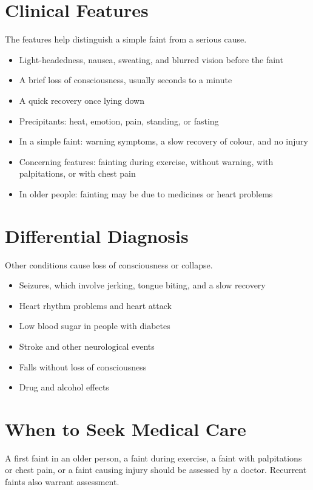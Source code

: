 \section*{Clinical Features}
The features help distinguish a simple faint from a serious cause.
\begin{itemize}
    \item Light-headedness, nausea, sweating, and blurred vision before the faint
    \item A brief loss of consciousness, usually seconds to a minute
    \item A quick recovery once lying down
    \item Precipitants: heat, emotion, pain, standing, or fasting
    \item In a simple faint: warning symptoms, a slow recovery of colour, and no injury
    \item Concerning features: fainting during exercise, without warning, with palpitations, or with chest pain
    \item In older people: fainting may be due to medicines or heart problems
\end{itemize}

\section*{Differential Diagnosis}
Other conditions cause loss of consciousness or collapse.
\begin{itemize}
    \item Seizures, which involve jerking, tongue biting, and a slow recovery
    \item Heart rhythm problems and heart attack
    \item Low blood sugar in people with diabetes
    \item Stroke and other neurological events
    \item Falls without loss of consciousness
    \item Drug and alcohol effects
\end{itemize}

\section*{When to Seek Medical Care}
A first faint in an older person, a faint during exercise, a faint with palpitations or chest pain, or a faint causing injury should be assessed by a doctor. Recurrent faints also warrant assessment.


